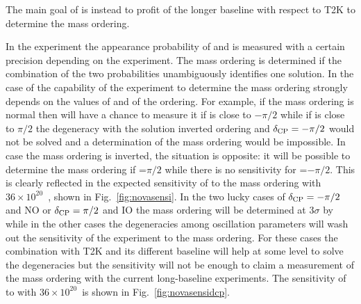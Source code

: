 The main goal of \nova is instead to profit of the longer baseline with respect to T2K to determine the mass ordering. 

%
%


In the experiment the appearance probability of \nue and \nueb is measured with a certain precision depending on the experiment. The mass ordering is determined if the combination of the two probabilities unambiguously identifies one solution. In the case of \nova the capability of the experiment to determine the mass ordering strongly depends on the values of \dcp and of the ordering. For example, if the mass ordering is normal then \nova will have a chance to measure it if \dcp is close to $-\pi/2$ while if \dcp is close to $\pi/2$ the degeneracy with the solution inverted ordering and $\delta_{\mathrm{CP}}=-\pi/2$ would not be solved and a determination of the mass ordering would be impossible. In case the mass ordering is inverted, the situation is opposite: it will be possible to determine the mass ordering if \dcp=$\pi/2$ while there is no sensitivity for \dcp=$-\pi/2$. This is clearly reflected in the expected sensitivity of \nova to the mass ordering with $36\times10^{20}$~\pot, shown in Fig.~\ref{fig:novasensi}.
In the two lucky cases of $\delta_{\mathrm{CP}}=-\pi/2$ and NO or $\delta_{\mathrm{CP}}=\pi/2$ and IO the mass ordering will be determined at $3\sigma$ by \nova while in the other cases the degeneracies among oscillation parameters will wash out the sensitivity of the experiment to the mass ordering. For these cases the combination with T2K and its different baseline will help at some level to solve the degeneracies but the sensitivity will not be enough to claim a measurement of the mass ordering with the current long-baseline experiments. The sensitivity of \nova to \dcp with  $36\times10^{20}$~\pot is shown in Fig.~\ref{fig:novasensidcp}.


